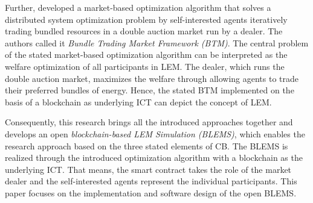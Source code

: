Further,  developed a market-based optimization algorithm
that solves a distributed system optimization problem by self-interested agents iteratively 
trading bundled resources in a double auction market run by a dealer. The authors called it 
\textit{Bundle Trading Market Framework (BTM)}. The central problem of the stated market-based 
optimization algorithm can be interpreted as the welfare optimization of all participants in LEM. 
The dealer, which runs the double auction market, maximizes the welfare through allowing agents 
to trade their preferred bundles of energy. Hence, the stated BTM implemented on the basis of a 
blockchain as underlying ICT can depict the concept of LEM.

Consequently, this research brings all the introduced approaches together 
and develops an open \textit{blockchain-based LEM Simulation (BLEMS)}, which enables the research 
approach based on the three stated elements of CB. The BLEMS is realized through 
the introduced optimization algorithm with a blockchain as the underlying ICT. 
That means, the smart contract takes the role of the market dealer and the self-interested 
agents represent the individual participants. This paper focuses on the 
implementation and software design of the open BLEMS.

\clearpage
